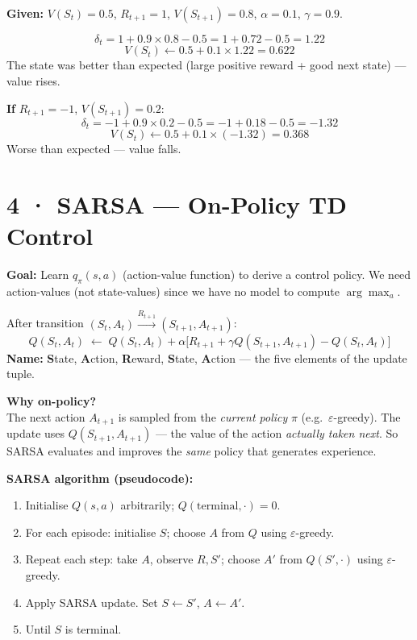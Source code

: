 \documentclass[11pt,a4paper]{article}
\begin{document}
\begin{tcolorbox}[exam={Worked Example — TD(0) update trace}]
\textbf{Given:} $V(S_t) = 0.5$, $R_{t+1} = 1$, $V(S_{t+1}) = 0.8$, $\alpha = 0.1$, $\gamma = 0.9$.

\[
  \delta_t = 1 + 0.9 \times 0.8 - 0.5 = 1 + 0.72 - 0.5 = 1.22
\]
\[
  V(S_t) \leftarrow 0.5 + 0.1 \times 1.22 = \mathbf{0.622}
\]
The state was better than expected (large positive reward + good next state) — value rises.

\medskip
\textbf{If} $R_{t+1} = -1$, $V(S_{t+1}) = 0.2$:
\[
  \delta_t = -1 + 0.9 \times 0.2 - 0.5 = -1 + 0.18 - 0.5 = -1.32
\]
\[
  V(S_t) \leftarrow 0.5 + 0.1 \times (-1.32) = \mathbf{0.368}
\]
Worse than expected — value falls.
\end{tcolorbox}

\section*{4 · SARSA — On-Policy TD Control}

\textbf{Goal:} Learn $q_\pi(s,a)$ (action-value function) to derive a control policy.
We need action-values (not state-values) since we have no model to compute $\arg\max_a$.

\begin{tcolorbox}[bold={SARSA Update Rule}]
After transition $(S_t, A_t) \xrightarrow{R_{t+1}} (S_{t+1}, A_{t+1})$:
\[
  Q(S_t, A_t) \;\leftarrow\; Q(S_t, A_t)
    + \alpha\bigl[R_{t+1} + \gamma Q(S_{t+1}, A_{t+1}) - Q(S_t, A_t)\bigr]
\]
\textbf{Name:} \textbf{S}tate, \textbf{A}ction, \textbf{R}eward, \textbf{S}tate, \textbf{A}ction
— the five elements of the update tuple.
\end{tcolorbox}

\textbf{Why on-policy?}\\
The next action $A_{t+1}$ is sampled from the \emph{current policy} $\pi$ (e.g.\ $\varepsilon$-greedy).
The update uses $Q(S_{t+1}, A_{t+1})$ — the value of the action \emph{actually taken next}.
So SARSA evaluates and improves the \emph{same} policy that generates experience.

\textbf{SARSA algorithm (pseudocode):}
\begin{enumerate}
  \item Initialise $Q(s,a)$ arbitrarily; $Q(\text{terminal},\cdot) = 0$.
  \item For each episode: initialise $S$; choose $A$ from $Q$ using $\varepsilon$-greedy.
  \item Repeat each step: take $A$, observe $R, S'$; choose $A'$ from $Q(S',\cdot)$ using $\varepsilon$-greedy.
  \item Apply SARSA update. Set $S \leftarrow S'$, $A \leftarrow A'$.
  \item Until $S$ is terminal.
\end{enumerate}
\end{document}
